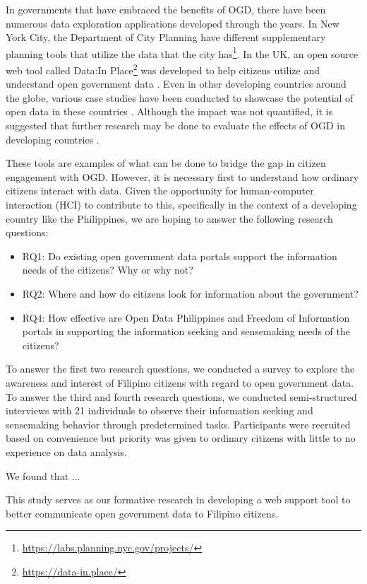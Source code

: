 \documentclass{sigchi}
\begin{document}
In governments that have embraced the benefits of OGD, there have been numerous data exploration applications developed through the years. In New York City, the Department of City Planning have different supplementary planning tools that utilize the data that the city has\footnote{\url{https://labs.planning.nyc.gov/projects/}}. In the UK, an open source web tool called Data:In Place\footnote{\url{https://data-in.place/}} was developed to help citizens utilize and understand open government data \cite{puussaar2018making}. Even in other developing countries around the globe, various case studies have been conducted to showcase the potential of open data in these countries \cite{farahi2018}. Although the impact was not quantified, it is suggested that further research may be done to evaluate the effects of OGD in developing countries \cite{farahi2018}.

These tools are examples of what can be done to bridge the gap in citizen engagement with OGD. However, it is necessary first to understand how ordinary citizens interact with data. Given the opportunity for human-computer interaction (HCI) to contribute to this, specifically in the context of a developing country like the Philippines, we are hoping to answer the following research questions:
\begin{itemize}
    \item RQ1: Do existing open government data portals support the information needs of the citizens? Why or why not?
    \item RQ2: Where and how do citizens look for information about the government?
    \item RQ4: How effective are Open Data Philippines and Freedom of Information portals in supporting the information seeking and sensemaking needs of the citizens?
\end{itemize}

To answer the first two research questions, we conducted a survey to explore the awareness and interest of Filipino citizens with regard to open government data. To answer the third and fourth research questions, we conducted semi-structured interviews with 21 individuals to observe their information seeking and sensemaking behavior through predetermined tasks. Participants were recruited based on convenience but priority was given to ordinary citizens with little to no experience on data analysis.

We found that ...

This study serves as our formative research in developing a web support tool to better communicate open government data to Filipino citizens.
\end{document}
